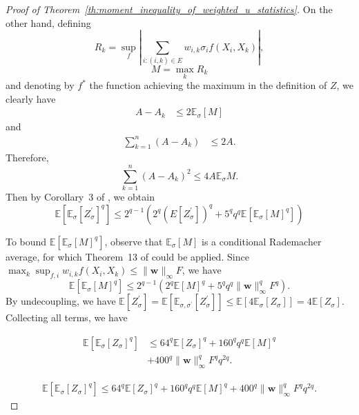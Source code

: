 \documentclass[letterpaper]{article} %
\def\DoubleColumn{}
\def\DoubleColumnEnd{}
\def\SingleColumn{}
\def\SingleColumnEnd{}
\newcommand{\E}{\mathbb{E}}
\newcommand{\weight}{\mathbf{w}}
\newcommand{\rademacher}{\sigma}
\newcommand{\pair}[1]{(#1)}
\begin{document}
\begin{proof}[Proof of Theorem~\ref{th:moment_inequality_of_weighted_u_statistics}]
On the other hand, defining
\[R_k=\sup_f|\sum_{i:\pair{i,k}\in E}w_{i,k}\rademacher_if(X_i,X_k)|,\]
\[M=\max_kR_k\]
and denoting by $f^*$ the function achieving the maximum in the definition of $Z$, we clearly have
\begin{align*}
    A-A_k
    &\le 2\E_\rademacher[M]
\end{align*}
and
\begin{align*}
    \sum_{k=1}^n(A-A_k)
    &\le 2A.
\end{align*}
Therefore,
\[\sum_{k=1}^n(A-A_k)^2\le 4A\E_\rademacher M.\]
Then by Corollary~3 of \cite{Boucheron2005}, we obtain
\begin{equation}
    \label{eq:inequality_rademacher_chaos_1}
    \E[\E_\rademacher[Z_\rademacher^\prime]^q]\le 2^{q-1}(2^q(E[Z_\rademacher^\prime])^q+5^qq^q\E[\E_\rademacher[M]^q])
\end{equation}

To bound $\E[\E_\rademacher[M]^q]$, observe that $\E_\rademacher[M]$ is a conditional Rademacher average, for which Theorem~13 of \cite{Boucheron2005} could be applied. Since $\max_k\sup_{f,i}w_{i,k}f(X_i,X_k)\le \|\weight{}\|_\infty F$, we have
\begin{equation}
    \label{eq:inequality_rademacher_chaos_2}
    \E[\E_\rademacher[M]^q]\le 2^{q-1}(2^q\E[M]^q+5^qq^q\|\weight{}\|_\infty^qF^q).
\end{equation}
By undecoupling, we have $\E[Z_\rademacher^\prime]=\E[\E_{\rademacher,\rademacher^\prime}[Z_\rademacher^\prime]]\le\E[4\E_\rademacher[Z_\rademacher]]=4\E[Z_\rademacher]$. Collecting all terms, we have
\DoubleColumn
\begin{align*}
    \E[\E_\rademacher[Z_\rademacher]^q]&\le 64^q\E[Z_\rademacher]^q+160^qq^q\E[M]^q\\
    &+400^q\|\weight{}\|_\infty^qF^qq^{2q}.
\end{align*}
\DoubleColumnEnd
\SingleColumn
\begin{align*}
    \E[\E_\rademacher[Z_\rademacher]^q]\le 64^q\E[Z_\rademacher]^q+160^qq^q\E[M]^q+400^q\|\weight{}\|_\infty^qF^qq^{2q}.
\end{align*}
\SingleColumnEnd


\end{proof}
\end{document}
